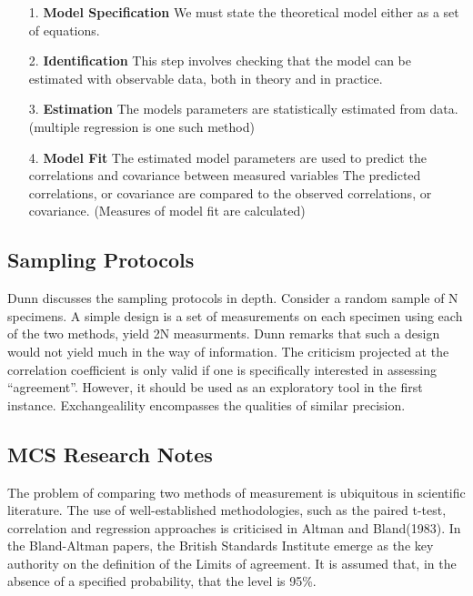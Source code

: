 \documentclass[12pt, a4paper]{report}
\theoremstyle{plain}
\theoremstyle{definition}
\theoremstyle{remark}
\begin{document}
	\begin{itemize}
		\item[1.] \textbf{Model Specification}
		We must state the theoretical model either as a set of equations.
		
		\item[2.] \textbf{Identification }
		This step involves checking that the model can be estimated with observable data, both in theory and in practice.
		
		\item[3.] \textbf{Estimation}
		The models parameters are statistically estimated from data. (multiple regression is one such method)
		
		\item[4.] \textbf{Model Fit}
		The estimated model parameters are used to predict the correlations and covariance between measured variables 
		The predicted correlations, or covariance are compared to the observed correlations, or covariance. (Measures of model fit are calculated)
	\end{itemize}
	
\subsection{Sampling Protocols}
Dunn discusses the sampling protocols in depth. Consider a random sample of N specimens. A simple design is a  set of measurements on each specimen using each of the two methods, yield 2N measurments. Dunn remarks that such a design would not yield much in the way of information.
The criticism projected at the correlation coefficient is only valid if one is specifically interested in assessing “agreement”. However, it should be used as an exploratory tool in the first instance.
Exchangealility encompasses the qualities of similar precision.



	
\subsection{MCS Research Notes}
The problem of comparing two methods of measurement is ubiquitous in scientific literature.
The use of  well-established methodologies, such as the paired t-test, correlation and regression approaches is criticised in Altman and Bland(1983).
In the Bland-Altman papers, the British Standards Institute emerge as the key authority on the definition of the Limits of agreement.
It is assumed that, in the absence of a specified probability, that the level is 95\%.
\end{document}
